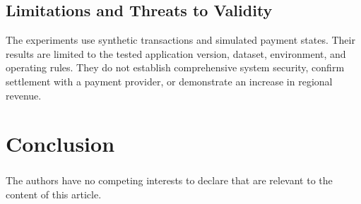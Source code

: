 \documentclass[runningheads]{llncs}
\begin{document}
\subsection{Limitations and Threats to Validity}

The experiments use synthetic transactions and simulated payment
states. Their results are limited to the tested application version,
dataset, environment, and operating rules. They do not establish
comprehensive system security, confirm settlement with a payment
provider, or demonstrate an increase in regional revenue.


\section{Conclusion}

%
%

\begin{credits}


\subsubsection{\discintname}
The authors have no competing interests to declare that are relevant
to the content of this article.


\end{credits}
\end{document}
